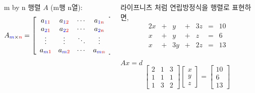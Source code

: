 \documentclass[aspectratio=169]{beamer}
\begin{document}
\begin{frame}
  \begin{columns}
    \begin{column}{0.5\textwidth}
      m by n 행렬 $A$ (m행 n열): \\
      \[
        A_{\textcolor{blue}{m}\times \textcolor{red}{n}} =
        \left[ {\begin{array}{cccc}
          a_{\textcolor{blue}{1}\textcolor{red}{1}} & a_{\textcolor{blue}{1}\textcolor{red}{2}} & \cdots & a_{\textcolor{blue}{1}\textcolor{red}{n}}\\
          a_{\textcolor{blue}{2}\textcolor{red}{1}} & a_{\textcolor{blue}{2}\textcolor{red}{2}} & \cdots & a_{\textcolor{blue}{2}\textcolor{red}{n}}\\
          \vdots & \vdots & \ddots & \vdots\\
          a_{\textcolor{blue}{m}\textcolor{red}{1}} & a_{\textcolor{blue}{m}\textcolor{red}{2}} & \cdots & a_{\textcolor{blue}{m}\textcolor{red}{n}}\\
        \end{array} } \right]
      \]    
    \end{column}
    \begin{column}{0.5\textwidth}
      라이프니츠 처럼 연립방정식을 행렬로 표현하면,\\
      \begin{alignat*}{4}
        2x & {}+{} &  y & {}+{} & 3z & {}={} & 10 \\
         x & {}+{} &  y & {}+{} &  z & {}={} &  6 \\
         x & {}+{} & 3y & {}+{} & 2z & {}={} & 13
      \end{alignat*}
      \centering{$\Downarrow$}\\
      $Ax = d$
      \[      
      \begin{bmatrix}
        2 & 1 & 3 \\
        1 & 1 & 1 \\
        1 & 3 & 2 
      \end{bmatrix}
      \begin{bmatrix}
        x \\ y \\ z 
      \end{bmatrix}
      =
      \begin{bmatrix}
        10 \\ 6 \\ 13 
      \end{bmatrix}
      \]
    \end{column}
  \end{columns}
\end{frame}
\end{document}
